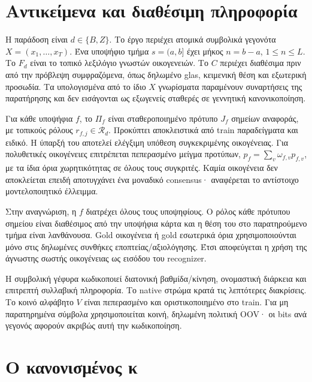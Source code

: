 \documentclass[
  10pt,
  a4paper,
]{report}
\begin{document}
\section{Αντικείμενα και διαθέσιμη
πληροφορία}\label{ux3b1ux3bdux3c4ux3b9ux3baux3b5ux3afux3bcux3b5ux3bdux3b1-ux3baux3b1ux3b9-ux3b4ux3b9ux3b1ux3b8ux3adux3c3ux3b9ux3bcux3b7-ux3c0ux3bbux3b7ux3c1ux3bfux3c6ux3bfux3c1ux3afux3b1}

Η παράδοση είναι \(d\in\{B,Z\}\). Το έργο περιέχει ατομικά συμβολικά
γεγονότα \(X=(x_1,\ldots,x_T)\). Ένα υποψήφιο τμήμα \(s=(a,b]\) έχει
μήκος \(n=b-a\), \(1\le n\le L\). Το \(F_d\) είναι το τοπικό λεξιλόγιο
γνωστών οικογενειών. Το \(C\) περιέχει διαθέσιμα πριν από την πρόβλεψη
συμφραζόμενα, όπως δηλωμένο glas, κειμενική θέση και εξωτερική προσωδία.
Τα υπολογισμένα από το ίδιο \(X\) γνωρίσματα παραμένουν συναρτήσεις της
παρατήρησης και δεν εισάγονται ως εξωγενείς σταθερές σε γεννητική
κανονικοποίηση.

Για κάθε υποψήφια \(f\), το \(\Pi_f\) είναι σταθεροποιημένο πρότυπο
\(J_f\) σημείων αναφοράς, με τοπικούς ρόλους \(r_{f,j}\in\mathcal R_d\).
Προκύπτει αποκλειστικά από train παραδείγματα και ειδικό. Η ύπαρξή του
αποτελεί ελέγξιμη υπόθεση συγκεκριμένης οικογένειας. Για πολυθετικές
οικογένειες επιτρέπεται πεπερασμένο μείγμα προτύπων,
\(p_f=\sum_v\omega_{f,v}p_{f,v}\), με τα ίδια όρια χωρητικότητας σε
όλους τους συγκριτές. Καμία οικογένεια δεν αποκλείεται επειδή
αποτυγχάνει ένα μοναδικό consensus· αναφέρεται το αντίστοιχο
μοντελοποιητικό έλλειμμα.

Στην αναγνώριση, η \(f\) διατρέχει όλους τους υποψηφίους. Ο ρόλος κάθε
πρότυπου σημείου είναι διαθέσιμος από την υποψήφια κάρτα και η θέση του
στο παρατηρούμενο τμήμα είναι λανθάνουσα. Gold οικογένεια ή gold
εσωτερικά όρια χρησιμοποιούνται μόνο στις δηλωμένες συνθήκες
εποπτείας/αξιολόγησης. Έτσι αποφεύγεται η χρήση της άγνωστης σωστής
οικογένειας ως εισόδου του recognizer.

Η συμβολική γέφυρα κωδικοποιεί διατονική βαθμίδα/κίνηση, ονομαστική
διάρκεια και επιτρεπτή συλλαβική πληροφορία. Το native στρώμα κρατά τις
λεπτότερες διακρίσεις. Το κοινό αλφάβητο \(V\) είναι πεπερασμένο και
οριστικοποιημένο στο train. Για μη παρατηρημένα σύμβολα χρησιμοποιείται
κοινή, δηλωμένη πολιτική OOV· οι bits ανά γεγονός αφορούν ακριβώς αυτή
την κωδικοποίηση.

\section{Ο κανονισμένος
κ}\label{ux3bf-ux3baux3b1ux3bdux3bfux3bdux3b9ux3c3ux3bcux3adux3bdux3bfux3c2-ux3ba}
\end{document}
